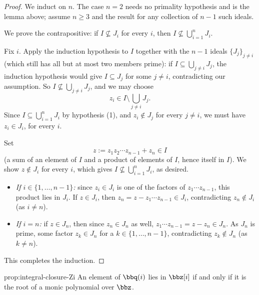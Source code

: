 \begin{proof}
We induct on $n$. The case $n=2$ needs no primality hypothesis and is the lemma above; assume $n \geq 3$ and the result for any collection of $n-1$ such ideals.

We prove the contrapositive: if $I \not\subseteq J_i$ for every $i$, then $I \not\subseteq \bigcup_{i=1}^n J_i$.

Fix $i$. Apply the induction hypothesis to $I$ together with the $n-1$ ideals $\{J_j\}_{j \neq i}$ (which still has all but at most two members prime): if $I \subseteq \bigcup_{j \neq i} J_j$, the induction hypothesis would give $I \subseteq J_j$ for some $j \neq i$, contradicting our assumption. So $I \not\subseteq \bigcup_{j \neq i} J_j$, and we may choose
\[
z_i \in I \setminus \bigcup_{j \neq i} J_j.
\]
Since $I \subseteq \bigcup_{i=1}^n J_i$ by hypothesis (1), and $z_i \notin J_j$ for every $j \neq i$, we must have $z_i \in J_i$, for every $i$.

Set
\[
z := z_1 z_2 \cdots z_{n-1} + z_n \in I
\]
(a sum of an element of $I$ and a product of elements of $I$, hence itself in $I$). We show $z \notin J_i$ for every $i$, which gives $I \not\subseteq \bigcup_{i=1}^n J_i$, as desired.

\begin{itemize}
    \item \emph{If $i \in \{1, \ldots, n-1\}$:} since $z_i \in J_i$ is one of the factors of $z_1 \cdots z_{n-1}$, this product lies in $J_i$. If $z \in J_i$, then $z_n = z - z_1 \cdots z_{n-1} \in J_i$, contradicting $z_n \notin J_i$ (as $i \neq n$).
    \item \emph{If $i = n$:} if $z \in J_n$, then since $z_n \in J_n$ as well, $z_1 \cdots z_{n-1} = z - z_n \in J_n$. As $J_n$ is prime, some factor $z_k \in J_n$ for a $k \in \{1, \ldots, n-1\}$, contradicting $z_k \notin J_n$ (as $k \neq n$).
\end{itemize}
This completes the induction.
\end{proof}

\begin{proposition}{}{prop:integral-closure-Zi}
An element of $\bbq(i)$ lies in $\bbz[i]$ if and only if it is the root of a monic polynomial over $\bbz$.
\end{proposition}

